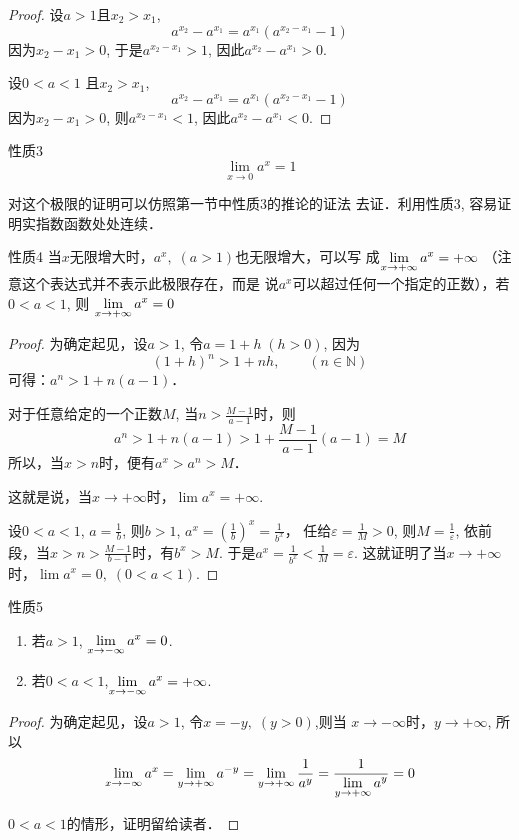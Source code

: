 \begin{proof}
设$a>1$且$x_2>x_1$,
\[a^{x_2}-a^{x_1}=a^{x_1}\left(a^{x_2-x_1}-1\right)\]
因为$x_2-x_1>0$, 于是$a^{x_2-x_1}>1$, 因此$a^{x_2}-a^{x_1}>0$.

设$0<a<1$ 且$x_2>x_1$,
\[a^{x_2}-a^{x_1}=a^{x_1}\left(a^{x_2-x_1}-1\right)\]
因为$x_2-x_1>0$, 则$a^{x_2-x_1}<1$, 因此$a^{x_2}-a^{x_1}<0$.  
\end{proof}

\begin{blk}{性质3}
\[\lim_{x\to 0} a^x=1\]
\end{blk}


对这个极限的证明可以仿照第一节中性质3的推论的证法
去证．利用性质3, 容易证明实指数函数处处连续．

\begin{blk}{性质4}
当$x$无限增大时，$a^x,\; (a>1)$也无限增大，可以写
成$\displaystyle\lim_{x\to +\infty} a^x=+\infty$ （注意这个表达式并不表示此极限存在，而是
说$a^x$可以超过任何一个指定的正数），若$0<a<1$, 则
$\displaystyle\lim_{x\to +\infty} a^x=0$
\end{blk}

\begin{proof}
  为确定起见，设$a>1$, 令$a=1+h\; (h>0)$, 因为
\[(1+h)^n>1+nh,\qquad (n\in\mathbb{N})\]
可得：$a^n>1+n(a-1)$．

对于任意给定的一个正数$M$, 当$n>\frac{M-1}{a-1}$时，则
\[a^n>1+n(a-1)>1+\frac{M-1}{a-1}(a-1)=M\]
所以，当$x>n$时，便有$a^x>a^n>M$．

这就是说，当$x\to +\infty$时，$\lim a^x=+\infty$.

设$0<a<1$, $a=\frac{1}{b}$, 则$b>1$, $a^x=\left(\frac{1}{b}\right)^x=\frac{1}{b^x}$，
任给$\varepsilon=\frac{1}{M}>0$, 则$M=\frac{1}{\varepsilon}$, 依前段，当$x>n>\frac{M-1}{b-1}$时，有$b^x>M$. 于是$a^x=\frac{1}{b^x}<\frac{1}{M}=\varepsilon$. 这就证明了当$x\to +\infty$时，$\lim a^x=0,\; (0<a<1)$.
\end{proof}

\begin{blk}{性质5}
\begin{enumerate}
  \item 若$a>1$, $\displaystyle\lim_{x\to-\infty} a^x=0$.
  \item 若$0<a<1$,$\displaystyle\lim_{x\to-\infty} a^x=+\infty$.
\end{enumerate}  
\end{blk}

\begin{proof}
为确定起见，设$a>1$, 令$x=-y,\; (y>0)$,则当
$x\to-\infty$时，$y\to +\infty$, 所以
\[\displaystyle\lim_{x\to-\infty} a^x=\displaystyle\lim_{y\to +\infty} a^{-y}=\displaystyle\lim_{y\to +\infty}\dfrac{1}{a^y}=\dfrac{1}{\displaystyle\lim_{y\to +\infty}a^y}=0\]

$0<a<1$的情形，证明留给读者．
\end{proof}

